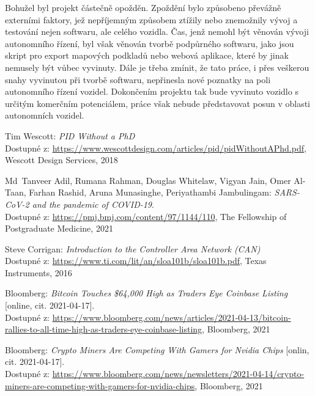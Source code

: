 \documentclass[czech, bachelor]{diploma}
\begin{document}
Bohužel byl projekt částečně opožděn. Zpoždění bylo způsobeno převážně externími faktory, jež nepříjemným způsobem ztížily nebo
znemožnily vývoj a testování nejen softwaru, ale celého vozidla. Čas, jenž nemohl být věnován vývoji autonomního řízení, byl však
věnován tvorbě podpůrného softwaru, jako jsou skript pro export mapových podkladů nebo webová aplikace, které by jinak nemusely
být vůbec vyvinuty. Dále je třeba zmínit, že tato práce, i přes veškerou snahy vyvinutou při tvorbě softwaru, nepřinesla nové
poznatky na poli autonomního řízení vozidel. Dokončením projektu tak bude vyvinuto vozidlo s určitým komerčním potenciálem, práce
však nebude představovat posun v oblasti autonomních vozidel.

\renewcommand{\bibname}{Zdroje}
\begin{thebibliography}{50}

Tim Wescott: \textit{PID Without a PhD} \\
Dostupné z: \url{https://www.wescottdesign.com/articles/pid/pidWithoutAPhd.pdf}, 
Wescott Design Services, 2018

Md~Tanveer Adil, Rumana Rahman, Douglas Whitelaw, Vigyan Jain, Omer Al-Taan, Farhan Rashid, Aruna Munasinghe,
Periyathambi Jambulingam: \textit{SARS-CoV-2 and the pandemic of COVID-19}. \\
Dostupné z: \url{https://pmj.bmj.com/content/97/1144/110}, 
The Fellowship of Postgraduate Medicine, 2021

Steve Corrigan: \textit{Introduction to the Controller Area Network (CAN)} \\
Dostupné z: \url{https://www.ti.com/lit/an/sloa101b/sloa101b.pdf}, 
Texas Instruments, 2016

Bloomberg: \textit{Bitcoin Touches \$64,000 High as Traders Eye Coinbase Listing} [online, cit. 2021-04-17]. \\
Dostupné z:
\url{https://www.bloomberg.com/news/articles/2021-04-13/bitcoin-rallies-to-all-time-high-as-traders-eye-coinbase-listing},
Bloomberg, 2021

Bloomberg: \textit{Crypto Miners Are Competing With Gamers for Nvidia Chips} [onlin, cit. 2021-04-17]. \\
Dostupné z:
\url{https://www.bloomberg.com/news/newsletters/2021-04-14/crypto-miners-are-competing-with-gamers-for-nvidia-chips},
Bloomberg, 2021


\end{thebibliography}
\end{document}
